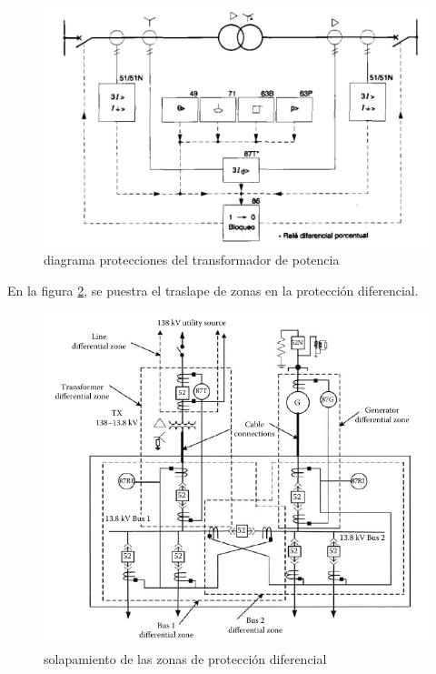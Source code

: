 \documentclass[a5paper]{book}%
\begin{document}
\begin{figure}[H]
	\centering  
	\caption{diagrama protecciones del  transformador de potencia}
	\label{fig:diagramatrafo1}
	\includegraphics[width=\linewidth]{proteccion_trafo_1}
\end{figure}

En la figura \ref{fig:zonas_diferencial},  se puestra el traslape de
zonas en la protección diferencial.

\begin{figure}[H]
	\centering
	\includegraphics[width=\linewidth]{diferencial_tranformador}
	\caption{solapamiento de las zonas de protección diferencial}
	\label{fig:zonas_diferencial}
\end{figure}
\end{document}

